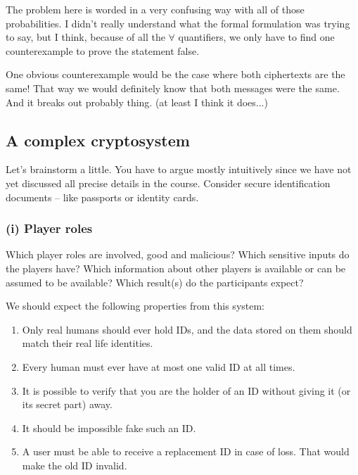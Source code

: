 \documentclass{article}
\begin{document}
  The problem here is worded in a very confusing way with all of those probabilities.
  I didn't really understand what the formal formulation was trying to say, but I think,
  because of all the $\forall$ quantifiers, we only have to find one counterexample to prove the statement false.

  One obvious counterexample would be the case where both ciphertexts are the same!
  That way we would definitely know that both messages were the same.
  And it breaks out probably thing.
  (at least I think it does...)

  \subsection{A complex cryptosystem}
  \begin{centerframebox}
    Let's brainstorm a little. You have to argue mostly intuitively since we
    have not yet discussed all precise details in the course. Consider secure
    identification documents -- like passports or identity cards.
  \end{centerframebox}

  \subsubsection*{(i) Player roles}
  \begin{centerframebox}
    Which player roles are involved, good and malicious? Which sensitive inputs do the players have? Which information about other
    players is available or can be assumed to be available? Which result(s) do the participants expect?
  \end{centerframebox}

  We should expect the following properties from this system:
  \begin{enumerate}[itemsep=3pt, parsep=0pt]
    \item Only real humans should ever hold IDs, and the data stored on them should match their real life identities.
    \item Every human must ever have at most one valid ID at all times.
    \item It is possible to verify that you are the holder of an ID without giving it (or its secret part) away.
    \item It should be impossible fake such an ID.
    \item A user must be able to receive a replacement ID in case of loss. That would make the old ID invalid.
  \end{enumerate}
\end{document}
